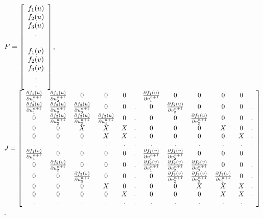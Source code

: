 \documentclass[11pt]{article}
\begin{document}
$F = 
\left[ {\begin{array}{*{20}c}
   f_1(u) \\
   f_2(u) \\
   f_3(u) \\
   . \\
   . \\
   f_1(v) \\
   f_2(v) \\
   f_3(v) \\
   . \\
   . \\
 \end{array} } \right]
$, $J = 
\left[ {\begin{array}{*{20}c}
   \frac{\partial f_1(u)}{\partial u^{n+1}_1} & \frac{\partial f_1(u)}{\partial u^{n+1}_2} & 0 & 0 & 0 & . & \frac{\partial f_1(u)}{\partial v^{n+1}_1} & 0 & 0 & 0 & 0 & .\\
   \frac{\partial f_2(u)}{\partial u^{n+1}_1} & \frac{\partial f_2(u)}{\partial u^{n+1}_2} & \frac{\partial f_2(u)}{\partial u^{n+1}_3} & 0 & 0 & . & 0 & \frac{\partial f_2(u)}{\partial v^{n+1}_2} & 0 & 0 & 0 & .\\
   0 & \frac{\partial f_3(u)}{\partial u^{n+1}_2} & \frac{\partial f_3(u)}{\partial u^{n+1}_3} & \frac{\partial f_3(u)}{\partial u^{n+1}_4} & 0 & . & 0 & 0 & \frac{\partial f_3(u)}{\partial v^{n+1}_3} & 0 & 0 & .\\
   0 & 0 & X & X & X & . & 0 & 0 & 0 & X & 0 & .\\
   0 & 0 & 0 & X & X & . & 0 & 0 & 0 & 0 & X & .\\
   . & . & . & . & . & . & . & . & . & . & . & .\\
   \frac{\partial f_1(v)}{\partial u^{n+1}_1} & 0 & 0 & 0 & 0 & . &\frac{\partial f_1(v)}{\partial v^{n+1}_1} & \frac{\partial f_1(v)}{\partial v^{n+1}_2} & 0 & 0 & 0 & .\\
   0 & \frac{\partial f_2(v)}{\partial u^{n+1}_2} & 0 & 0 & 0 & . & \frac{\partial f_2(v)}{\partial v^{n+1}_1} & \frac{\partial f_2(v)}{\partial v^{n+1}_2} & \frac{\partial f_2(v)}{\partial v^{n+1}_3} & 0 & 0 & .\\
   0 & 0 & \frac{\partial f_3(v)}{\partial u^{n+1}_3} & 0 & 0 & . & 0 & \frac{\partial f_3(v)}{\partial v^{n+1}_2} & \frac{\partial f_3(v)}{\partial v^{n+1}_3} & \frac{\partial f_3(v)}{\partial v^{n+1}_4} & 0 & .\\
   0 & 0 & 0 & X & 0 & . & 0 & 0 & X & X & X & .\\
   0 & 0 & 0 & 0 & X & . & 0 & 0 & 0 & X & X & .\\
   . & . & . & . & . & . & . & . & . & . & . & .\\
 \end{array} } \right]
$.
\end{document}
